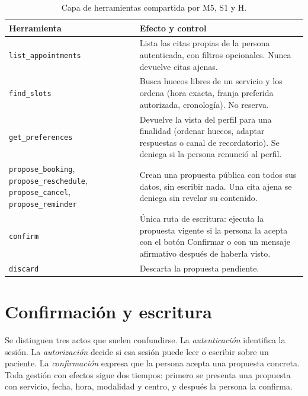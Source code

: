 \begin{table}[!htbp]
\centering
\caption{Capa de herramientas compartida por M5, S1 y H.}
\label{tab:herramientas}
\small
\begin{tabularx}{\textwidth}{L{0.27\textwidth}Y}
\toprule
\textbf{Herramienta} & \textbf{Efecto y control} \\
\midrule
\texttt{list\_appointments} & Lista las citas propias de la persona autenticada, con filtros opcionales. Nunca devuelve citas ajenas. \\
\texttt{find\_slots} & Busca huecos libres de un servicio y los ordena (hora exacta, franja preferida autorizada, cronología). No reserva. \\
\texttt{get\_preferences} & Devuelve la vista del perfil para una finalidad (ordenar huecos, adaptar respuestas o canal de recordatorio). Se deniega si la persona renunció al perfil. \\
\texttt{propose\_booking}, \texttt{propose\_reschedule}, \texttt{propose\_cancel}, \texttt{propose\_reminder} & Crean una propuesta pública con todos sus datos, sin escribir nada. Una cita ajena se deniega sin revelar su contenido. \\
\texttt{confirm} & Única ruta de escritura: ejecuta la propuesta vigente si la persona la acepta con el botón Confirmar o con un mensaje afirmativo después de haberla visto. \\
\texttt{discard} & Descarta la propuesta pendiente. \\
\bottomrule
\end{tabularx}
\end{table}

\section{Confirmación y escritura}
\label{sec:diseno-confirmacion}

Se distinguen tres actos que suelen confundirse. La \emph{autenticación}
identifica la sesión. La \emph{autorización} decide si esa sesión puede leer o
escribir sobre un paciente. La \emph{confirmación} expresa que la persona acepta
una propuesta concreta. Toda gestión con efectos sigue dos tiempos: primero se
presenta una propuesta con servicio, fecha, hora, modalidad y centro, y después
la persona la confirma.

